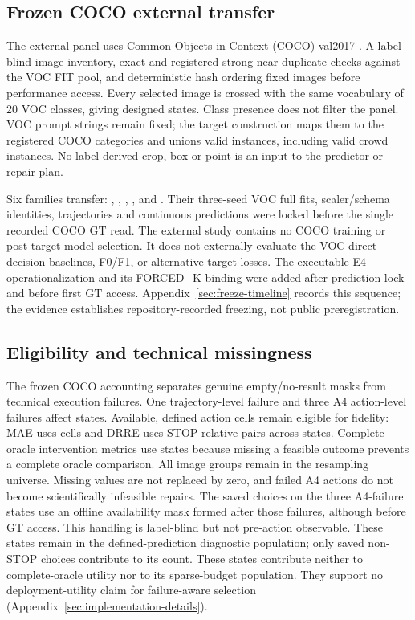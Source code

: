 \subsection{Frozen COCO external transfer}
The external panel uses Common Objects in Context (COCO) val2017
\citep{lin2014coco}. A label-blind
image inventory, exact and registered strong-near duplicate checks against
the VOC FIT pool, and deterministic hash ordering fixed
 images before performance access. Every selected image
is crossed with the same vocabulary of 20 VOC classes, giving
 designed states. Class presence does not filter the
panel. VOC prompt strings remain fixed; the target construction maps them
to the registered COCO categories and unions valid instances, including
valid crowd instances. No label-derived crop, box or point is an input to
the predictor or repair plan.

Six families transfer: , ,
, ,  and
. Their three-seed VOC full fits, scaler/schema identities,
trajectories and continuous predictions were locked before the single
recorded COCO GT read. The external study contains no COCO training or
post-target model selection. It does not externally evaluate the VOC
direct-decision baselines, F0/F1, or alternative target losses.
The executable E4 operationalization and its FORCED\_K binding were added
after prediction lock and before first GT access. Appendix~\ref{sec:freeze-timeline}
records this sequence; the evidence establishes repository-recorded
freezing, not public preregistration.

\subsection{Eligibility and technical missingness}
\label{sec:missingness-timing}
The frozen COCO accounting separates genuine empty/no-result masks from
technical execution failures. One trajectory-level failure and three A4
action-level failures affect  states. Available,
defined action cells remain eligible for fidelity: MAE uses
 cells and DRRE uses  STOP-relative
pairs across  states. Complete-oracle intervention
metrics use  states because missing a feasible outcome
prevents a complete oracle comparison. All  image groups
remain in the resampling universe. Missing values are not replaced by zero,
and failed A4 actions do not become scientifically infeasible repairs.
The saved choices on the three A4-failure states use an offline availability
mask formed after those failures, although before GT access. This handling
is label-blind but not pre-action observable. These states remain in the
defined-prediction diagnostic population; only saved non-STOP choices
contribute to its count. These states contribute neither to
complete-oracle utility nor to its sparse-budget population. They support
no deployment-utility claim for failure-aware selection
(Appendix~\ref{sec:implementation-details}).

